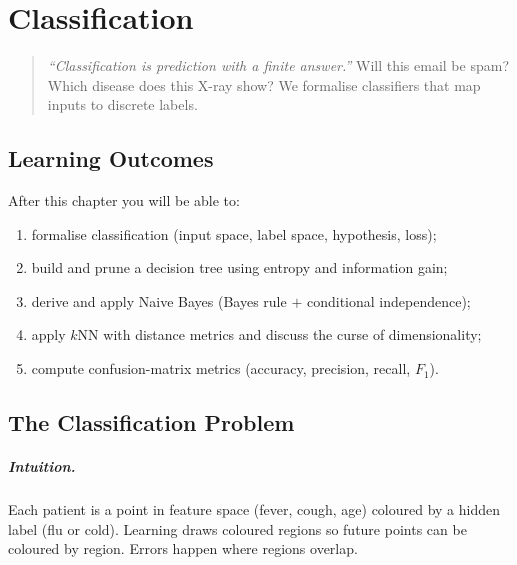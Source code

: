 \chapter{Classification}
\label{ch:classification}

\begin{quote}
\emph{``Classification is prediction with a finite answer.''} Will this email be spam? Which disease does this X-ray show? We formalise classifiers that map inputs to discrete labels.
\end{quote}

\noindent{}
\vspace{0.4em}

\section*{Learning Outcomes}
After this chapter you will be able to:
\begin{enumerate}[label=(L\arabic*)]
    \item formalise classification (input space, label space, hypothesis, loss);
    \item build and prune a decision tree using entropy and information gain;
    \item derive and apply Naive Bayes (Bayes rule $+$ conditional independence);
    \item apply $k$NN with distance metrics and discuss the curse of dimensionality;
    \item compute confusion-matrix metrics (accuracy, precision, recall, $F_1$).
\end{enumerate}

\section{The Classification Problem}
\label{sec:class-problem}
\paragraph{Intuition.} Each patient is a point in feature space (fever, cough, age) coloured by a hidden label (flu or cold). Learning draws coloured regions so future points can be coloured by region. Errors happen where regions overlap.

